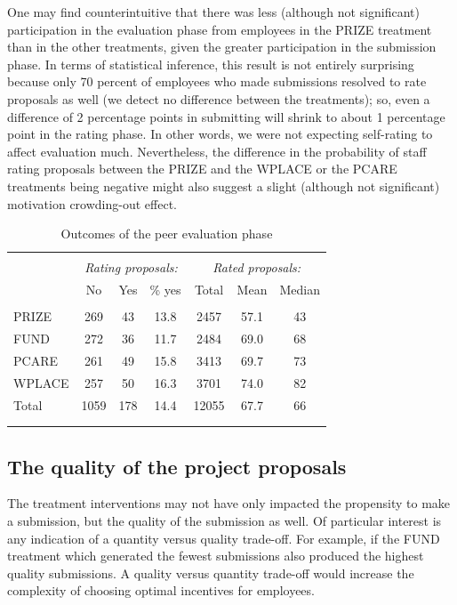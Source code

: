 \documentclass[12pt, titlepage]{article}
\begin{document}
One may find counterintuitive that there was less (although not
significant) participation in the evaluation phase from employees in the
PRIZE treatment than in the other treatments, given the greater
participation in the submission phase. In terms of statistical
inference, this result is not entirely surprising because only 70
percent of employees who made submissions resolved to rate proposals as
well (we detect no difference between the treatments); so, even a
difference of 2 percentage points in submitting will shrink to about 1
percentage point in the rating phase. In other words, we were not
expecting self-rating to affect evaluation much. Nevertheless, the
difference in the probability of staff rating proposals between the
PRIZE and the WPLACE or the PCARE treatments being negative might also
suggest a slight (although not significant) motivation crowding-out
effect.

\begin{table}
\centering
\caption{Outcomes of the peer evaluation phase}
\label{tab: ratings}
\begin{tabular}{@{}lcccccc}
  \\[-1.8ex]\hline \hline \\[-1.8ex]
 & \multicolumn{3}{c}{\emph{Rating proposals:}} &         \multicolumn{3}{c}{\emph{Rated proposals:}} \\
 \cmidrule(lr){2-4}\cmidrule(lr){5-7} & No & Yes & \% yes & Total & Mean & Median \\ 
  \hline \\[-1.86ex]
PRIZE & 269 & 43 & 13.8 & 2457 & 57.1 & 43 \\ 
  FUND & 272 & 36 & 11.7 & 2484 & 69.0 & 68 \\ 
  PCARE & 261 & 49 & 15.8 & 3413 & 69.7 & 73 \\ 
  WPLACE & 257 & 50 & 16.3 & 3701 & 74.0 & 82 \\ 
  [1.8ex] Total & 1059 & 178 & 14.4 & 12055 & 67.7 & 66 \\ 
   \\[-1.8ex]\hline \hline \\[-1.8ex]
\end{tabular}
\end{table}

\subsection{The quality of the project
proposals}\label{the-quality-of-the-project-proposals}

The treatment interventions may not have only impacted the propensity to
make a submission, but the quality of the submission as well. Of
particular interest is any indication of a quantity versus quality
trade-off. For example, if the FUND treatment which generated the fewest
submissions also produced the highest quality submissions. A quality
versus quantity trade-off would increase the complexity of choosing
optimal incentives for employees.
\end{document}
